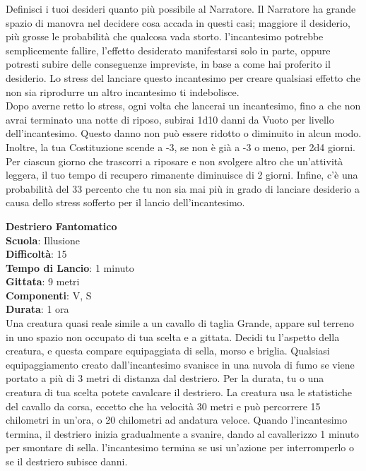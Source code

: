 \begin{multicols}{2}
\medskip
Definisci i tuoi desideri quanto più possibile al Narratore. Il Narratore ha grande spazio di
manovra nel decidere cosa accada in questi casi; maggiore il desiderio, più grosse le probabilità che qualcosa vada storto. l'incantesimo potrebbe semplicemente fallire, l’effetto desiderato manifestarsi solo in parte, oppure potresti subire delle conseguenze impreviste, in base a come hai proferito il desiderio. Lo stress del lanciare questo incantesimo per creare qualsiasi effetto che non sia riprodurre un altro incantesimo ti indebolisce.\\
Dopo averne retto lo stress, ogni volta che lancerai un incantesimo, fino a che non avrai terminato una notte di riposo, subirai 1d10 danni da Vuoto per livello dell'incantesimo. Questo danno non può essere ridotto o diminuito in alcun modo. Inoltre, la tua Costituzione scende a -3, se non è già a -3 o meno, per 2d4 giorni.\\
Per ciascun giorno che trascorri a riposare e non svolgere altro che un'attività leggera, il tuo tempo di recupero rimanente diminuisce di 2 giorni. Infine, c’è una probabilità del 33 percento che tu non sia mai più in grado di lanciare desiderio a causa dello stress sofferto per il lancio dell'incantesimo.

\medskip\textbf{Destriero Fantomatico}\\
\textbf{Scuola}: Illusione\\
\textbf{Difficoltà}:  15\\
\textbf{Tempo di Lancio}: 1 minuto\\
\textbf{Gittata}: 9 metri\\
\textbf{Componenti}: V, S\\
\textbf{Durata}: 1 ora\\
Una creatura quasi reale simile a un cavallo di taglia Grande, appare sul terreno in uno spazio non occupato di tua scelta e a gittata. Decidi tu l’aspetto della creatura, e questa compare equipaggiata di sella, morso e briglia. Qualsiasi equipaggiamento creato dall'incantesimo svanisce in una nuvola di fumo se viene portato a più di 3 metri di distanza dal destriero. Per la durata, tu o una creatura di tua scelta potete cavalcare il destriero. La creatura usa le statistiche del cavallo da corsa, eccetto che ha velocità 30 metri e può percorrere 15 chilometri in un'ora, o 20 chilometri ad andatura veloce. Quando l'incantesimo termina, il destriero inizia gradualmente a svanire, dando al cavallerizzo 1 minuto per smontare di sella. l'incantesimo termina se usi un'azione per interromperlo o se il destriero subisce danni.


\end{multicols}
